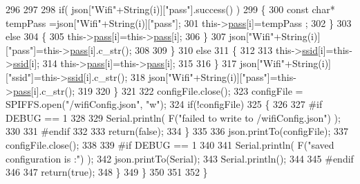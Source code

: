 \begin{DoxyCode}
296                     
297                     
298                     \textcolor{keywordflow}{if}( json[\textcolor{stringliteral}{"Wifi"}+String(i)][\textcolor{stringliteral}{"pass"}].success() )
299                     \{
300                         \textcolor{keyword}{const} \textcolor{keywordtype}{char}* tempPass =json[\textcolor{stringliteral}{"Wifi"}+String(i)][\textcolor{stringliteral}{"pass"}];
301                         this->\hyperlink{classCoolWifi_a0c3332a149245aaad060b32593a54c9b}{pass}[i]=tempPass ;                    
302                     \}
303                     \textcolor{keywordflow}{else}
304                     \{
305                         this->\hyperlink{classCoolWifi_a0c3332a149245aaad060b32593a54c9b}{pass}[i]=this->\hyperlink{classCoolWifi_a0c3332a149245aaad060b32593a54c9b}{pass}[i];                    
306                     \}
307                     json[\textcolor{stringliteral}{"Wifi"}+String(i)][\textcolor{stringliteral}{"pass"}]=this->\hyperlink{classCoolWifi_a0c3332a149245aaad060b32593a54c9b}{pass}[i].c\_str();           
308                 
309                 \}
310                 \textcolor{keywordflow}{else}
311                 \{
312                     
313                     this->\hyperlink{classCoolWifi_a893b21d0fed821438733bba2e73fb4c2}{ssid}[i]=this->\hyperlink{classCoolWifi_a893b21d0fed821438733bba2e73fb4c2}{ssid}[i];
314                     this->\hyperlink{classCoolWifi_a0c3332a149245aaad060b32593a54c9b}{pass}[i]=this->\hyperlink{classCoolWifi_a0c3332a149245aaad060b32593a54c9b}{pass}[i];                    
315                     
316                 \}
317                 json[\textcolor{stringliteral}{"Wifi"}+String(i)][\textcolor{stringliteral}{"ssid"}]=this->\hyperlink{classCoolWifi_a893b21d0fed821438733bba2e73fb4c2}{ssid}[i].c\_str();
318                 json[\textcolor{stringliteral}{"Wifi"}+String(i)][\textcolor{stringliteral}{"pass"}]=this->\hyperlink{classCoolWifi_a0c3332a149245aaad060b32593a54c9b}{pass}[i].c\_str();           
319                         
320             \}
321 
322             configFile.close();
323             configFile = SPIFFS.open(\textcolor{stringliteral}{"/wifiConfig.json"}, \textcolor{stringliteral}{"w"});
324             \textcolor{keywordflow}{if}(!configFile)
325             \{
326             
327 \textcolor{preprocessor}{            #if DEBUG == 1 }
328 
329                 Serial.println( F(\textcolor{stringliteral}{"failed to write to /wifiConfig.json"}) );
330             
331 \textcolor{preprocessor}{            #endif}
332 
333                 \textcolor{keywordflow}{return}(\textcolor{keyword}{false});              
334             \}
335             
336             json.printTo(configFile);
337             configFile.close();
338 
339 \textcolor{preprocessor}{        #if DEBUG == 1 }
340 
341             Serial.println( F(\textcolor{stringliteral}{"saved configuration is :"}) );
342             json.printTo(Serial);
343             Serial.println();
344         
345 \textcolor{preprocessor}{        #endif}
346 
347             \textcolor{keywordflow}{return}(\textcolor{keyword}{true}); 
348         \}
349     \}   
350     
351 
352 \}
\end{DoxyCode}
